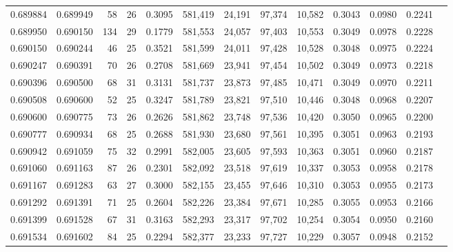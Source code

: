\begin{tabular}{rrrrrrrrrrrrr}
0.689884 & 0.689949 &  58 &  26 &                                     0.3095 & 581,419 &  24,191 &  97,374 &  10,582 & 0.3043 & 0.0980 & 0.2241 \\
0.689950 & 0.690150 & 134 &  29 &                                     0.1779 & 581,553 &  24,057 &  97,403 &  10,553 & 0.3049 & 0.0978 & 0.2228 \\
0.690150 & 0.690244 &  46 &  25 &                                     0.3521 & 581,599 &  24,011 &  97,428 &  10,528 & 0.3048 & 0.0975 & 0.2224 \\
0.690247 & 0.690391 &  70 &  26 &                                     0.2708 & 581,669 &  23,941 &  97,454 &  10,502 & 0.3049 & 0.0973 & 0.2218 \\
0.690396 & 0.690500 &  68 &  31 &                                     0.3131 & 581,737 &  23,873 &  97,485 &  10,471 & 0.3049 & 0.0970 & 0.2211 \\
0.690508 & 0.690600 &  52 &  25 &                                     0.3247 & 581,789 &  23,821 &  97,510 &  10,446 & 0.3048 & 0.0968 & 0.2207 \\
0.690600 & 0.690775 &  73 &  26 &                                     0.2626 & 581,862 &  23,748 &  97,536 &  10,420 & 0.3050 & 0.0965 & 0.2200 \\
0.690777 & 0.690934 &  68 &  25 &                                     0.2688 & 581,930 &  23,680 &  97,561 &  10,395 & 0.3051 & 0.0963 & 0.2193 \\
0.690942 & 0.691059 &  75 &  32 &                                     0.2991 & 582,005 &  23,605 &  97,593 &  10,363 & 0.3051 & 0.0960 & 0.2187 \\
0.691060 & 0.691163 &  87 &  26 &                                     0.2301 & 582,092 &  23,518 &  97,619 &  10,337 & 0.3053 & 0.0958 & 0.2178 \\
0.691167 & 0.691283 &  63 &  27 &                                     0.3000 & 582,155 &  23,455 &  97,646 &  10,310 & 0.3053 & 0.0955 & 0.2173 \\
0.691292 & 0.691391 &  71 &  25 &                                     0.2604 & 582,226 &  23,384 &  97,671 &  10,285 & 0.3055 & 0.0953 & 0.2166 \\
0.691399 & 0.691528 &  67 &  31 &                                     0.3163 & 582,293 &  23,317 &  97,702 &  10,254 & 0.3054 & 0.0950 & 0.2160 \\
0.691534 & 0.691602 &  84 &  25 &                                     0.2294 & 582,377 &  23,233 &  97,727 &  10,229 & 0.3057 & 0.0948 & 0.2152 \\

\end{tabular}
